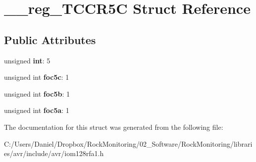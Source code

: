 \hypertarget{struct____reg___t_c_c_r5_c}{}\section{\+\_\+\+\_\+reg\+\_\+\+T\+C\+C\+R5C Struct Reference}
\label{struct____reg___t_c_c_r5_c}
\subsection*{Public Attributes}
\begin{DoxyCompactItemize}
\item 
unsigned {\bfseries int}\+: 5\hypertarget{struct____reg___t_c_c_r5_c_ac189e5838ae2c4904263809bb74acdb7}{}\label{struct____reg___t_c_c_r5_c_ac189e5838ae2c4904263809bb74acdb7}

\item 
unsigned int {\bfseries foc5c}\+: 1\hypertarget{struct____reg___t_c_c_r5_c_afb22deab08997d4accfb0f4d9ef3a27b}{}\label{struct____reg___t_c_c_r5_c_afb22deab08997d4accfb0f4d9ef3a27b}

\item 
unsigned int {\bfseries foc5b}\+: 1\hypertarget{struct____reg___t_c_c_r5_c_a9ff32449f443c17f9fcc1ede8fd81298}{}\label{struct____reg___t_c_c_r5_c_a9ff32449f443c17f9fcc1ede8fd81298}

\item 
unsigned int {\bfseries foc5a}\+: 1\hypertarget{struct____reg___t_c_c_r5_c_aa285046ce452aa12bed1ff205c8f0aae}{}\label{struct____reg___t_c_c_r5_c_aa285046ce452aa12bed1ff205c8f0aae}

\end{DoxyCompactItemize}


The documentation for this struct was generated from the following file\+:\begin{DoxyCompactItemize}
\item 
C\+:/\+Users/\+Daniel/\+Dropbox/\+Rock\+Monitoring/02\+\_\+\+Software/\+Rock\+Monitoring/libraries/avr/include/avr/iom128rfa1.\+h\end{DoxyCompactItemize}
